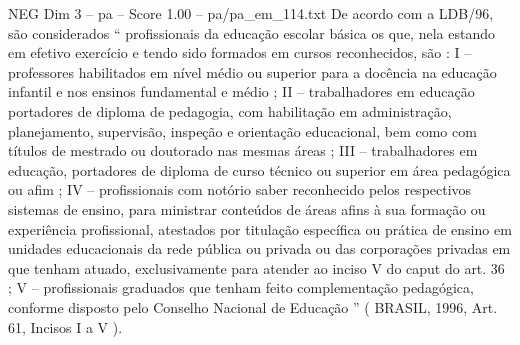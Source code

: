 \begin{textsample}{NEG Dim 3 – pa – Score 1.00 – pa/pa\_em\_114.txt}
De acordo com a LDB/96, são considerados “ profissionais da educação escolar básica os que, nela estando em efetivo exercício e tendo sido formados em cursos reconhecidos, são : I – professores habilitados em nível médio ou superior para a docência na educação infantil e nos ensinos fundamental e médio ; II – trabalhadores em educação portadores de diploma de pedagogia, com habilitação em administração, planejamento, supervisão, inspeção e orientação educacional, bem como com títulos de mestrado ou doutorado nas mesmas áreas ; III – trabalhadores em educação, portadores de diploma de curso técnico ou superior em área pedagógica ou afim ; IV – profissionais com notório saber reconhecido pelos respectivos sistemas de ensino, para ministrar conteúdos de áreas afins à sua formação ou experiência profissional, atestados por titulação específica ou prática de ensino em unidades educacionais da rede pública ou privada ou das corporações privadas em que tenham atuado, exclusivamente para atender ao inciso V do caput do art. 36 ; V – profissionais graduados que tenham feito complementação pedagógica, conforme disposto pelo Conselho Nacional de Educação ” ( BRASIL, 1996, Art. 61, Incisos I a V ).

\end{textsample}
